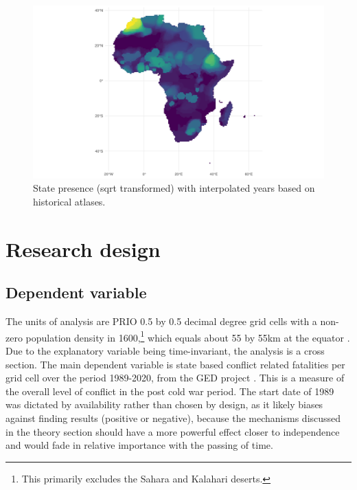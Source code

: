\documentclass[12pt]{article}
\begin{document}

\begin{figure}[htpb]
	\centering
	\includegraphics[width=\linewidth]{../R/Output/sqrtSpAll.pdf}
	\caption{State presence (sqrt transformed) with interpolated years based
	on historical atlases.}
	\label{Sp_i}
\end{figure}


\section{Research design} \label{Research design}

\subsection{Dependent variable} \label{Dependent variable}

The units of analysis are PRIO 0.5 by 0.5 decimal degree grid cells with a
non-zero population density in 1600,\footnote{This primarily excludes the Sahara
and Kalahari deserts.} which equals about 55 by 55km at the equator
\citep{Tollefsen2012}. Due to the explanatory variable being time-invariant, the
analysis is a cross section. The main dependent variable is state based conflict
related fatalities per grid cell over the period 1989-2020, from the GED project
\citep{Sundberg2013}. This is a measure of the overall level of conflict in the
post cold war period. The start date of 1989 was dictated by availability rather
than chosen by design, as it likely biases against finding results (positive or
negative), because the mechanisms discussed in the theory section should have a
more powerful effect closer to independence and would fade in relative
importance with the passing of time.
\end{document}
